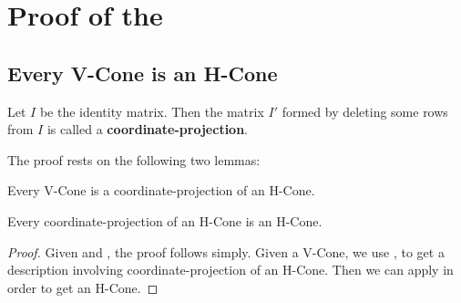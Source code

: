 \chapter{Proof of the \MWT}

\section{Every V-Cone is an H-Cone}

\begin{Def}
	Let $I$ be the identity matrix.  Then the matrix $I'$ formed by deleting some rows from $I$ is called a \textbf{coordinate-projection}.
\end{Def}

The proof rests on the following two lemmas:

\begin{Lemma}\label{vconelift}
	 Every V-Cone is a coordinate-projection of an H-Cone.
\end{Lemma}

\begin{Lemma}\label{hconeproject}
	 Every coordinate-projection of an H-Cone is an H-Cone.
\end{Lemma}

\begin{proof}
	Given  and , the proof follows simply.  Given a V-Cone, we use , to get a description involving coordinate-projection of an H-Cone.  Then we can apply  in order to get an H-Cone.
\end{proof}

